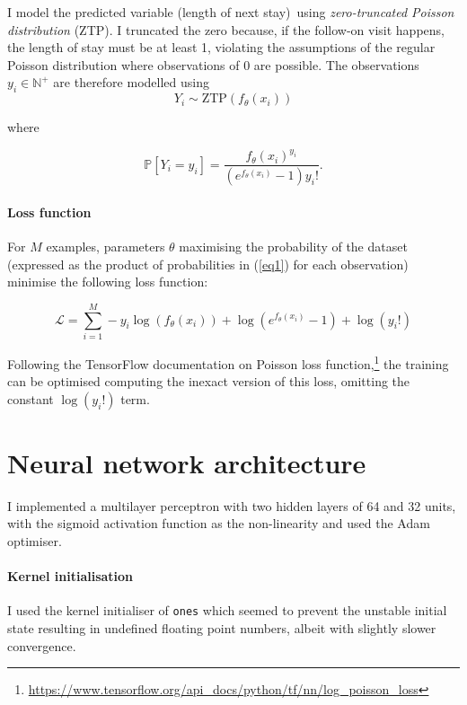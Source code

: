 \documentclass[10pt, twocolumn]{article}
\begin{document}
I model the predicted variable (length of next stay) using \textit{zero-truncated Poisson distribution} (ZTP). I truncated the zero because, if the follow-on visit happens, the length of stay must be at least 1, violating the assumptions of the regular Poisson distribution where observations of 0 are possible. The observations $y_i \in \mathbb{N}^+$ are therefore modelled using \[Y_i \sim \mathrm{ZTP}(f_\theta(x_i))\]

where 

\begin{equation}
	\mathbb{P}[Y_i = y_i] = \frac{f_\theta(x_i)^{y_i}}{(e^{f_\theta(x_i)} - 1)y_i!}.
	\label{eq1}
\end{equation}

\paragraph{Loss function} For $M$ examples, parameters $\theta$ maximising the probability of the dataset (expressed as the product of probabilities in (\ref{eq1}) for each observation) minimise the following loss function:

\begin{equation}
	\mathcal{L} = \sum\limits_{i=1}^{M} -y_i \log(f_\theta(x_i)) + \log(e^{f_\theta(x_i)} - 1) + \log(y_i!)
\end{equation}

Following the TensorFlow documentation on Poisson loss function,\footnote{\url{https://www.tensorflow.org/api_docs/python/tf/nn/log_poisson_loss}} the training can be optimised computing the inexact version of this loss, omitting the constant $\log(y_i!)$ term.


\section{Neural network architecture}
I implemented a multilayer perceptron with two hidden layers of 64 and 32 units, with the sigmoid activation function as the non-linearity and used the Adam optimiser. 

\paragraph{Kernel initialisation} I used the kernel initialiser of \texttt{ones} which seemed to prevent the unstable initial state resulting in undefined floating point numbers, albeit with slightly slower convergence.
\end{document}
